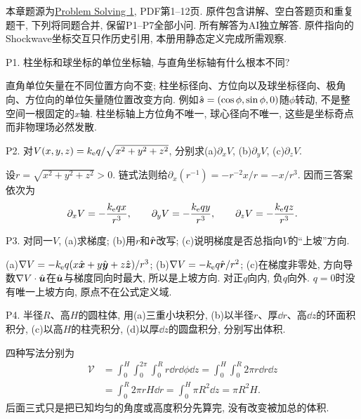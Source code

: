 本章题源为\href{https://ocw.mit.edu/courses/8-02-physics-ii-electricity-and-magnetism-spring-2007/resources/solving01/}{Problem Solving 1}, PDF第1--12页. 原件包含讲解、空白答题页和重复题干, 下列将同题合并, 保留P1--P7全部小问. 所有解答为AI独立解答. 原件指向的Shockwave坐标交互只作历史引用, 本册用静态定义完成所需观察.

\begin{exercise}\label{ps1:1}
P1. 柱坐标和球坐标的单位坐标轴, 与直角坐标轴有什么根本不同?
\end{exercise}
\begin{solution}
直角单位矢量在不同位置方向不变; 柱坐标径向、方位向以及球坐标径向、极角向、方位向的单位矢量随位置改变方向. 例如$\hat{\boldsymbol{s}}=(\cos\phi,\sin\phi,0)$随$\phi$转动, 不是整空间一根固定的$x$轴. 柱坐标轴上方位角不唯一, 球心径向不唯一, 这些是坐标奇点而非物理场必然发散.
\end{solution}

\begin{exercise}
P2. 对$V(x,y,z)=k_{\mathrm e} q/\sqrt{x^2+y^2+z^2}$, 分别求(a)$\partial_xV$, (b)$\partial_yV$, (c)$\partial_zV$.
\end{exercise}
\begin{solution}
设$r=\sqrt{x^2+y^2+z^2}>0$. 链式法则给$\partial_x(r^{-1})=-r^{-2}x/r=-x/r^3$. 因而三答案依次为
\[
\partial_xV=-\frac{k_{\mathrm e} qx}{r^3},\qquad
\partial_yV=-\frac{k_{\mathrm e} qy}{r^3},\qquad
\partial_zV=-\frac{k_{\mathrm e} qz}{r^3}.
\]
\end{solution}

\begin{exercise}
P3. 对同一$V$, (a)求梯度; (b)用$r$和$\hat{\boldsymbol{r}}$改写; (c)说明梯度是否总指向$V$的“上坡”方向.
\end{exercise}
\begin{solution}
(a)$\nabla V=-k_{\mathrm e} q(x\hat{\boldsymbol{x}}+y\hat{\boldsymbol{y}}+z\hat{\boldsymbol{z}})/r^3$; (b)$\nabla V=-k_{\mathrm e} q\hat{\boldsymbol{r}}/r^2$; (c)在梯度非零处, 方向导数$\nabla V\cdot\hat{\boldsymbol{u}}$在$\hat{\boldsymbol{u}}$与梯度同向时最大, 所以是上坡方向. 对正$q$向内, 负$q$向外. $q=0$时没有唯一上坡方向, 原点不在公式定义域.
\end{solution}

\begin{exercise}
P4. 半径$R$、高$H$的圆柱体, 用(a)三重小块积分, (b)以半径$r$、厚$\dd r$、高$\dd z$的环面积积分, (c)以高$H$的柱壳积分, (d)以厚$\dd z$的圆盘积分, 分别写出体积.
\end{exercise}
\begin{solution}
四种写法分别为
\begin{align*}
\mathcal V&=\int_0^H\int_0^{2\pi}\int_0^Rr\dd r\dd\phi\dd z
=\int_0^H\int_0^R2\pi r\dd r\dd z\\
&=\int_0^R2\pi rH\dd r=\int_0^H\pi R^2\dd z=\pi R^2H.
\end{align*}
后面三式只是把已知均匀的角度或高度积分先算完, 没有改变被加总的体积.
\end{solution}

